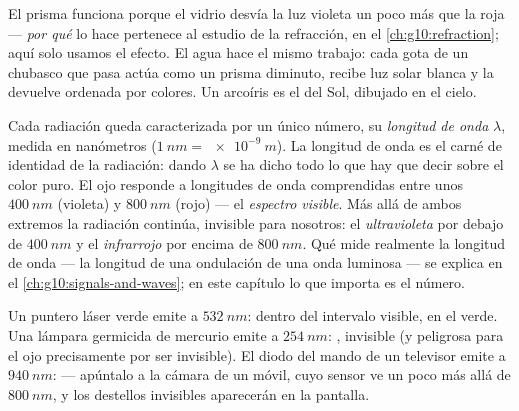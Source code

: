 \begin{remark}\label{rem:g10:light-spectra:rainbow}
El prisma funciona porque el vidrio desvía la luz violeta un poco más
que la roja --- \emph{por qué} lo hace pertenece al estudio de la
refracción, en el \cref{ch:g10:refraction}; aquí solo usamos el efecto.
El agua hace el mismo trabajo: cada gota de un chubasco que pasa actúa
como un prisma diminuto, recibe luz solar blanca y la devuelve ordenada
por colores. Un arcoíris es el  del Sol, dibujado en el cielo.
\end{remark}

\begin{definition}\label{def:g10:light-spectra:wavelength}
Cada radiación  queda caracterizada por un único número, su
\emph{longitud de onda} $\lambda$, medida en
nanómetros ($\qty{1}{nm} = \qty{e-9}{m}$). La longitud de onda es el
carné de identidad de la radiación: dando $\lambda$ se ha dicho todo lo
que hay que decir sobre el color puro. El ojo responde a longitudes de
onda comprendidas entre unos $\qty{400}{nm}$ (violeta) y
$\qty{800}{nm}$ (rojo) --- el \emph{espectro visible}. Más allá de ambos extremos la radiación continúa, invisible
para nosotros: el \emph{ultravioleta} por debajo de
$\qty{400}{nm}$ y el \emph{infrarrojo} por encima de
$\qty{800}{nm}$. Qué mide realmente la longitud de onda --- la longitud
de una ondulación de una onda luminosa --- se explica en el
\cref{ch:g10:signals-and-waves}; en este capítulo lo que importa es el
número.
\end{definition}

\begin{example}\label{ex:g10:light-spectra:classify}
Un puntero láser verde emite a $\qty{532}{nm}$: dentro del intervalo
visible, en el verde. Una lámpara germicida de mercurio emite a
$\qty{254}{nm}$: , invisible (y peligrosa para el ojo
precisamente por ser invisible). El diodo del mando de un televisor
emite a $\qty{940}{nm}$:  --- apúntalo a la cámara de un
móvil, cuyo sensor ve un poco más allá de $\qty{800}{nm}$, y los
destellos invisibles aparecerán en la pantalla.
\end{example}

